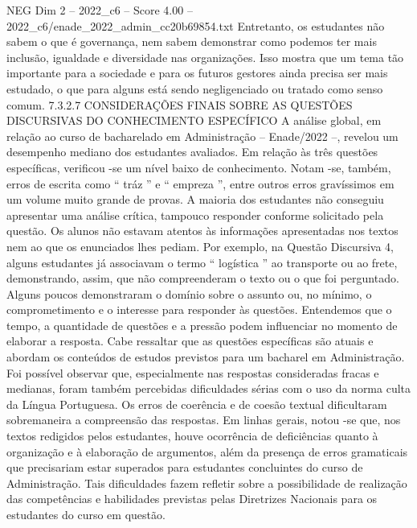 \begin{textsample}{NEG Dim 2 – 2022\_c6 – Score 4.00 – 2022\_c6/enade\_2022\_admin\_cc20b69854.txt}
Entretanto, os estudantes não sabem o que é governança, nem sabem demonstrar como podemos ter mais inclusão, igualdade e diversidade nas organizações.
Isso mostra que um tema tão importante para a sociedade e para os futuros gestores ainda precisa ser mais estudado, o que para alguns está sendo negligenciado ou tratado como senso comum. 7.3.2.7 CONSIDERAÇÕES FINAIS SOBRE AS QUESTÕES DISCURSIVAS DO CONHECIMENTO ESPECÍFICO A análise global, em relação ao curso de bacharelado em Administração – Enade/2022 –, revelou um desempenho mediano dos estudantes avaliados.
Em relação às três questões específicas, verificou -se um nível baixo de conhecimento.
Notam -se, também, erros de escrita como “ tráz ” e “ empreza ”, entre outros erros gravíssimos em um volume muito grande de provas.
A maioria dos estudantes não conseguiu apresentar uma análise crítica, tampouco responder conforme solicitado pela questão.
Os alunos não estavam atentos às informações apresentadas nos textos nem ao que os enunciados lhes pediam.
Por exemplo, na Questão Discursiva 4, alguns estudantes já associavam o termo “ logística ” ao transporte ou ao frete, demonstrando, assim, que não compreenderam o texto ou o que foi perguntado.
Alguns poucos demonstraram o domínio sobre o assunto ou, no mínimo, o comprometimento e o interesse para responder às questões.
Entendemos que o tempo, a quantidade de questões e a pressão podem influenciar no momento de elaborar a resposta.
Cabe ressaltar que as questões específicas são atuais e abordam os conteúdos de estudos previstos para um bacharel em Administração.
Foi possível observar que, especialmente nas respostas consideradas fracas e medianas, foram também percebidas dificuldades sérias com o uso da norma culta da Língua Portuguesa.
Os erros de coerência e de coesão textual dificultaram sobremaneira a compreensão das respostas.
Em linhas gerais, notou -se que, nos textos redigidos pelos estudantes, houve ocorrência de deficiências quanto à organização e à elaboração de argumentos, além da presença de erros gramaticais que precisariam estar superados para estudantes concluintes do curso de Administração.
Tais dificuldades fazem refletir sobre a possibilidade de realização das competências e habilidades previstas pelas Diretrizes Nacionais para os estudantes do curso em questão.

\end{textsample}
